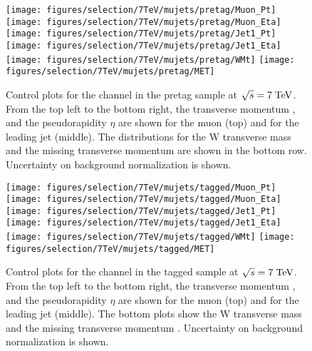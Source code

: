 \begin{figure}
  \centering
  \texttt{[image: figures/selection/7TeV/mujets/pretag/Muon\_Pt]}
  \texttt{[image: figures/selection/7TeV/mujets/pretag/Muon\_Eta]}
  \texttt{[image: figures/selection/7TeV/mujets/pretag/Jet1\_Pt]}
  \texttt{[image: figures/selection/7TeV/mujets/pretag/Jet1\_Eta]}
  \texttt{[image: figures/selection/7TeV/mujets/pretag/WMt]}
  \texttt{[image: figures/selection/7TeV/mujets/pretag/MET]}
  \caption[Control plots for the \mujets{} channel in the pretag
    sample at $\sqrt{s} = 7 \TeV{}$.]{Control plots for the \mujets{} channel in the pretag
    sample at $\sqrt{s} = 7 \TeV{}$. From the top left to the bottom right, the transverse
    momentum \pt{}, and the pseudorapidity $\eta{}$ are shown for the
    muon (top) and for the leading jet (middle).  The distributions
    for the W transverse mass \mtw{} and the missing transverse
    momentum \met{} are shown in the bottom row. 
    Uncertainty on background normalization is shown.}
  \label{fig:2011mu_pretag}
\end{figure}
%
\begin{figure}
\centering
\texttt{[image: figures/selection/7TeV/mujets/tagged/Muon\_Pt]}
\texttt{[image: figures/selection/7TeV/mujets/tagged/Muon\_Eta]}
\texttt{[image: figures/selection/7TeV/mujets/tagged/Jet1\_Pt]}
\texttt{[image: figures/selection/7TeV/mujets/tagged/Jet1\_Eta]}
\texttt{[image: figures/selection/7TeV/mujets/tagged/WMt]}
\texttt{[image: figures/selection/7TeV/mujets/tagged/MET]}
\caption[Control plots for the \mujets{} channel in the tagged
  sample at $\sqrt{s} = 7 \TeV{}$]{Control plots for the \mujets{} channel in the tagged
  sample at $\sqrt{s} = 7 \TeV{}$.  From the top left to the bottom right, the transverse
  momentum \pt{}, and the pseudorapidity $\eta$ are shown for the
  muon (top) and for the leading jet (middle). The bottom plots show
  the W transverse mass \mtw{} and the missing transverse
  momentum \met{}. Uncertainty on background normalization is shown.}
\label{fig:2011mu_tagged}
\end{figure}
%
